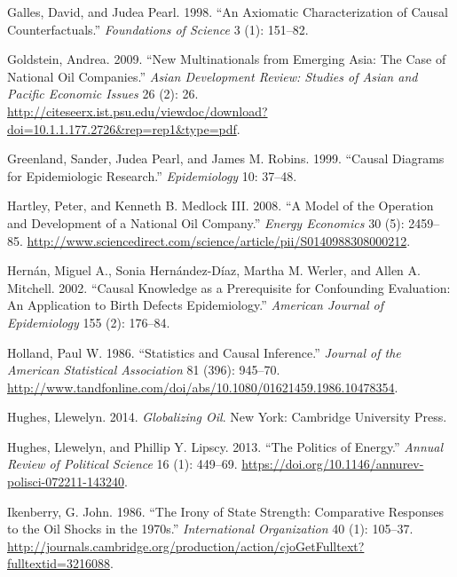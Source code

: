 \documentclass[11pt,]{book}
\begin{document}
\leavevmode\hypertarget{ref-galles_axiomatic_1998}{}%
Galles, David, and Judea Pearl. 1998. ``An Axiomatic Characterization of Causal Counterfactuals.'' \emph{Foundations of Science} 3 (1): 151--82.

\leavevmode\hypertarget{ref-goldstein_new_2009}{}%
Goldstein, Andrea. 2009. ``New Multinationals from Emerging Asia: The Case of National Oil Companies.'' \emph{Asian Development Review: Studies of Asian and Pacific Economic Issues} 26 (2): 26. \url{http://citeseerx.ist.psu.edu/viewdoc/download?doi=10.1.1.177.2726\&rep=rep1\&type=pdf}.

\leavevmode\hypertarget{ref-greenland_causal_1999}{}%
Greenland, Sander, Judea Pearl, and James M. Robins. 1999. ``Causal Diagrams for Epidemiologic Research.'' \emph{Epidemiology} 10: 37--48.

\leavevmode\hypertarget{ref-hartley_model_2008}{}%
Hartley, Peter, and Kenneth B. Medlock III. 2008. ``A Model of the Operation and Development of a National Oil Company.'' \emph{Energy Economics} 30 (5): 2459--85. \url{http://www.sciencedirect.com/science/article/pii/S0140988308000212}.

\leavevmode\hypertarget{ref-hernan_causal_2002}{}%
Hernán, Miguel A., Sonia Hernández-Díaz, Martha M. Werler, and Allen A. Mitchell. 2002. ``Causal Knowledge as a Prerequisite for Confounding Evaluation: An Application to Birth Defects Epidemiology.'' \emph{American Journal of Epidemiology} 155 (2): 176--84.

\leavevmode\hypertarget{ref-holland_statistics_1986}{}%
Holland, Paul W. 1986. ``Statistics and Causal Inference.'' \emph{Journal of the American Statistical Association} 81 (396): 945--70. \url{http://www.tandfonline.com/doi/abs/10.1080/01621459.1986.10478354}.

\leavevmode\hypertarget{ref-hughes_globalizing_2014}{}%
Hughes, Llewelyn. 2014. \emph{Globalizing Oil}. New York: Cambridge University Press.

\leavevmode\hypertarget{ref-hughes_politics_2013}{}%
Hughes, Llewelyn, and Phillip Y. Lipscy. 2013. ``The Politics of Energy.'' \emph{Annual Review of Political Science} 16 (1): 449--69. \url{https://doi.org/10.1146/annurev-polisci-072211-143240}.

\leavevmode\hypertarget{ref-ikenberry_irony_1986}{}%
Ikenberry, G. John. 1986. ``The Irony of State Strength: Comparative Responses to the Oil Shocks in the 1970s.'' \emph{International Organization} 40 (1): 105--37. \url{http://journals.cambridge.org/production/action/cjoGetFulltext?fulltextid=3216088}.
\end{document}
